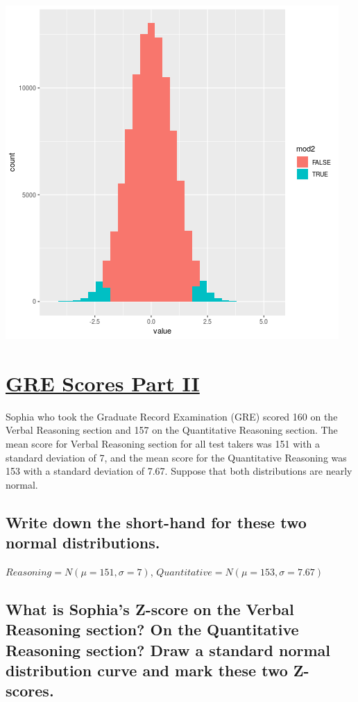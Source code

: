 \documentclass[11pt]{article}
\begin{document}
\begin{center}
\includegraphics[width=.9\linewidth]{1-4.png}
\end{center}

\section{\underline{GRE Scores Part II}}
\label{sec:org5aac020}
Sophia who took the Graduate Record Examination (GRE) scored 160 on the Verbal Reasoning section and 157 on the Quantitative Reasoning section. The mean score for Verbal Reasoning section for all test takers was 151 with a standard deviation of 7, and the mean score for the Quantitative Reasoning was 153 with a standard deviation of 7.67. Suppose that both distributions are nearly normal.

\subsection{Write down the short-hand for these two normal distributions.}
\label{sec:org8f405f9}
\(Reasoning = N(\mu = 151, \sigma = 7)\), \(Quantitative = N(\mu = 153, \sigma = 7.67)\)

\subsection{What is Sophia's Z-score on the Verbal Reasoning section? On the Quantitative Reasoning section? Draw a standard normal distribution curve and mark these two Z-scores.}
\label{sec:org92e669e}
\end{document}
